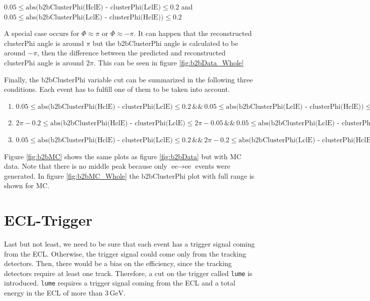 \documentclass[a4paper,11pt,twosided,final,german,openbib,pdftex,listof=totoc,bibliography=totoc]{scrbook}
\begin{document}
 $0.05 \leq \textrm{abs(b2bClusterPhi(HclE) - clusterPhi(LclE)} \leq 0.2 $ and  $0.05 \leq \textrm{abs(b2bClusterPhi(LclE) - clusterPhi(HclE))} \leq 0.2$
\newline

A special case occurs for $\Phi \approx \pi$ or $\Phi \approx -\pi$. It can happen that the reconstructed clusterPhi angle is around $\pi$ but the b2bClusterPhi angle is calculated to be around $-\pi$, then the difference between the predicted and reconstructed clusterPhi angle is around $2\pi$. This can be seen in figure \ref{fig:b2bData_Whole}

Finally, the b2bClusterPhi variable cut can be summarized in the following three conditions. Each event has to fulfill one of them to be taken into account.

\begin{enumerate}[label=(\alph*)]
	\item $0.05 \leq \textrm{abs(b2bClusterPhi(HclE) - clusterPhi(LclE)} \leq 0.2 \, \&\& \, 0.05 \leq \textrm{abs(b2bClusterPhi(LclE) - clusterPhi(HclE))} \leq 0.2$
	\item $2\pi - 0.2 \leq \textrm{abs(b2bClusterPhi(HclE) - clusterPhi(LclE)} \leq 2\pi - 0.05 \, \&\& \, 0.05 \leq \textrm{abs(b2bClusterPhi(LclE) - clusterPhi(HclE))} \leq 0.2$
	\item $0.05 \leq \textrm{abs(b2bClusterPhi(HclE) - clusterPhi(LclE)} \leq 0.2 \, \&\& \, 2\pi - 0.2 \leq \textrm{abs(b2bClusterPhi(LclE) - clusterPhi(HclE))} \leq 2\pi - 0.05$
\end{enumerate}





Figure \ref{fig:b2bMC} shows the same plots as figure \ref{fig:b2bData} but with MC data. Note that there is no middle peak because only $\textrm{ee} \rightarrow \textrm{ee}$ events were generated. In figure \ref{fig:b2bMC_Whole} the b2bClusterPhi plot with full range is shown for MC.

\section{ECL-Trigger}
\label{sec:ECLTrigger}

Last but not least, we need to be sure that each event has a trigger signal coming from the ECL. Otherwise, the trigger signal could come only from the tracking detectors. Then, there would be a bias on the efficiency, since the tracking detectors require at least one track. Therefore, a cut on the trigger called \texttt{lume} is introduced. \texttt{lume} requires a trigger signal coming from the ECL and a total energy in the ECL of more than $3\,\textrm{GeV}$.\cite{lumeTrigger}
\end{document}
